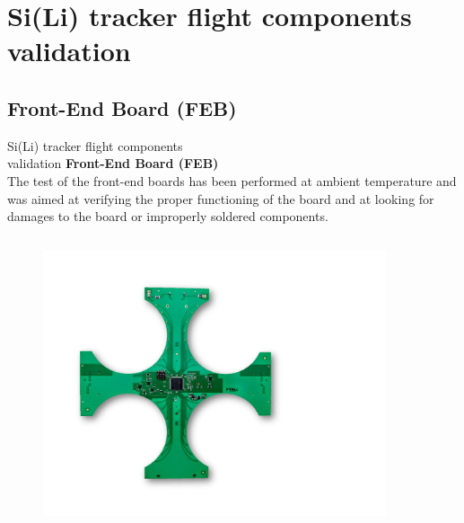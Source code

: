 \documentclass[aspectratio=169,xcolor=dvipsnames]{beamer}
\begin{document}

\section{Si(Li) tracker flight components validation}

\subsection{Front-End Board (FEB)}
\begin{frame}{\vspace{-0.3cm}Si(Li) tracker flight components \\ \vskip-0.15cm validation}
    \fontsize{9pt}{1}\selectfont
    \vskip0.15cm
    \textbf{\large Front-End Board (FEB)} \\
    \vspace{0.15cm}
    The test of the front-end boards has been performed at ambient temperature and was aimed at verifying the proper functioning of the board and at looking for damages to the board or improperly soldered components.

    \vskip0.3cm
    \begin{columns}
            \begin{figure}
                \centering
                \includegraphics[width=0.9\textwidth]{images/flight_components_validation/FEB_immagine.pdf}
            \end{figure}
        

\end{columns}
\end{frame}
\end{document}
